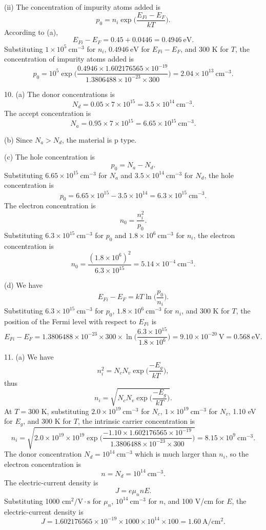 \documentclass[a4paper]{article}
\begin{document}
(ii) The concentration of impurity atoms added is
$$p_0=n_i\exp{\Big(\frac{E_{Fi}-E_F}{kT}\Big)}.$$
According to (a),
$$E_{Fi}-E_F=0.45+0.0446=0.4946\ \text{eV}.$$
Substituting $1\times10^5\ \text{cm}^{-3}$ for $n_i$, $0.4946\ \text{eV}$ for $E_{Fi}-E_F$, and 300 K for $T$, the concentration of impurity atoms added is
$$p_0=10^5\exp{\Big(\frac{0.4946\times1.602176565\times10^{-19}}{1.3806488\times10^{-23}\times300}\Big)}=2.04\times10^{13}\ \text{cm}^{-3}.$$

10. (a) The donor concentrations is
$$N_d=0.05\times7\times10^{15}=3.5\times10^{14}\ \text{cm}^{-3}.$$
The accept concentration is
$$N_a=0.95\times7\times10^{15}=6.65\times10^{15}\ \text{cm}^{-3}.$$

(b) Since $N_a>N_d$, the material is $\boxed{\text{p type}}$.

(c) The hole concentration is
$$p_0=N_a-N_d.$$
Substituting $6.65\times10^{15}\ \text{cm}^{-3}$ for $N_a$ and $3.5\times10^{14}\ \text{cm}^{-3}$ for $N_d$, the hole concentration is
$$p_0=6.65\times10^{15}-3.5\times10^{14}=6.3\times10^{15}\ \text{cm}^{-3}.$$
The electron concentration is
$$n_0=\frac{n_i^2}{p_0}.$$
Substituting $6.3\times10^{15}\ \text{cm}^{-3}$ for $p_0$ and $1.8\times10^{6}\ \text{cm}^{-3}$ for $n_i$, the electron concentration is
$$n_0=\frac{(1.8\times10^{6})^2}{6.3\times10^{15}}=5.14\times10^{-4}\ \text{cm}^{-3}.$$

(d) We have
$$E_{Fi}-E_F=kT\ln{\Big(\frac{p_0}{n_i}\Big)}.$$
Substituting $6.3\times10^{15}\ \text{cm}^{-3}$ for $p_0$, $1.8\times10^{6}\ \text{cm}^{-3}$ for $n_i$, and 300 K for $T$, the position of the Fermi level with respect to $E_{Fi}$ is
$$E_{Fi}-E_F=1.3806488\times10^{-23}\times300\times\ln{\Big(\frac{6.3\times10^{15}}{1.8\times10^{6}}\Big)}=9.10\times10^{-20}\ \text{V}=0.568\ \text{eV}.$$

11. (a) We have
\begin{equation}
    n_i^2=N_cN_v\exp{\Big(\frac{-E_g}{kT}\Big)},
\end{equation}
thus
$$n_i=\sqrt{N_cN_v\exp{\Big(\frac{-E_g}{kT}\Big)}}.$$
At $T=300$ K, substituting $2.0\times10^{19}\ \text{cm}^{-3}$ for $N_c$, $1\times10^{19}\ \text{cm}^{-3}$ for $N_v$, 1.10 eV for $E_g$, and 300 K for $T$, the intrinsic carrier concentration is
$$n_i=\sqrt{2.0\times10^{19}\times10^{19}\exp{\Big(\frac{-1.10\times1.602176565\times10^{-19}}{1.3806488\times10^{-23}\times300}\Big)}}=8.15\times10^{9}\ \text{cm}^{-3}.$$
The donor concentration $N_d=10^{14}\ \text{cm}^{-3}$ which is much larger than $n_i$, so the electron concentration is
$$n=N_d=10^{14}\ \text{cm}^{-3}.$$
The electric-current density is
$$J=e\mu_nnE.$$
Substituting 1000 $\mathrm{cm}^2/\text{V}\cdot\text{s}$ for $\mu_n$, $10^{14}\ \text{cm}^{-3}$ for $n$, and 100 V/cm for $E$, the electric-current density is
$$J=1.602176565\times10^{-19}\times1000\times10^{14}\times100=1.60\ \text{A}/\mathrm{cm}^2.$$
\end{document}
